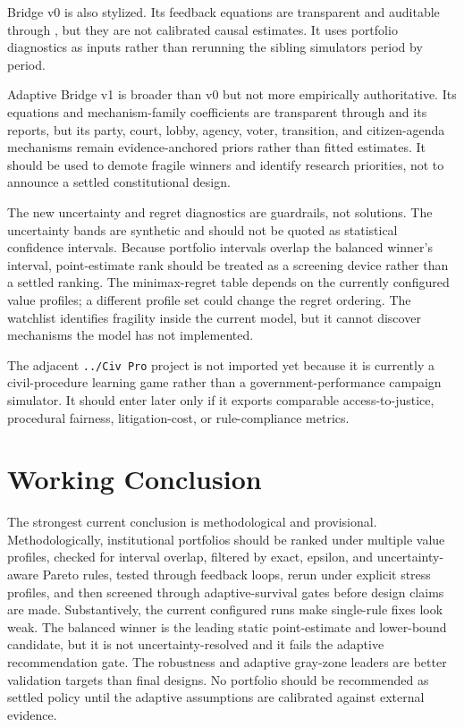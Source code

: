 \documentclass[11pt]{article}
\begin{document}
Bridge v0 is also stylized. Its feedback equations are transparent and auditable through , but they are not calibrated causal estimates. It uses portfolio diagnostics as inputs rather than rerunning the sibling simulators period by period.

Adaptive Bridge v1 is broader than v0 but not more empirically authoritative. Its equations and mechanism-family coefficients are transparent through  and its reports, but its party, court, lobby, agency, voter, transition, and citizen-agenda mechanisms remain evidence-anchored priors rather than fitted estimates. It should be used to demote fragile winners and identify research priorities, not to announce a settled constitutional design.

The new uncertainty and regret diagnostics are guardrails, not solutions. The uncertainty bands are synthetic and should not be quoted as statistical confidence intervals. Because \BalancedUncertaintyOverlapCount{} portfolio intervals overlap the balanced winner's interval, point-estimate rank should be treated as a screening device rather than a settled ranking. The minimax-regret table depends on the currently configured value profiles; a different profile set could change the regret ordering. The watchlist identifies fragility inside the current model, but it cannot discover mechanisms the model has not implemented.

The adjacent \texttt{../Civ Pro} project is not imported yet because it is currently a civil-procedure learning game rather than a government-performance campaign simulator. It should enter later only if it exports comparable access-to-justice, procedural fairness, litigation-cost, or rule-compliance metrics.

\section{Working Conclusion}

The strongest current conclusion is methodological and provisional. Methodologically, institutional portfolios should be ranked under multiple value profiles, checked for interval overlap, filtered by exact, epsilon, and uncertainty-aware Pareto rules, tested through feedback loops, rerun under explicit stress profiles, and then screened through adaptive-survival gates before design claims are made. Substantively, the current configured runs make single-rule fixes look weak. The balanced winner is the leading static point-estimate and lower-bound candidate, but it is not uncertainty-resolved and it fails the adaptive recommendation gate. The robustness and adaptive gray-zone leaders are better validation targets than final designs. No portfolio should be recommended as settled policy until the adaptive assumptions are calibrated against external evidence.
\end{document}
